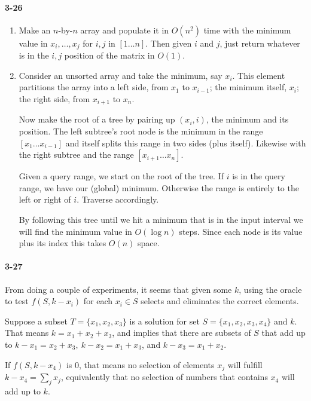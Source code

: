 \documentclass{report}
\begin{document}
\paragraph{3-26}
\begin{enumerate}[label=\alph*)]
	\item Make an $n$-by-$n$ array and populate it in $O(n^2)$ time with the minimum value in $x_i,\ldots,x_j$ for $i,j$ in $[1\ldots n]$. Then given $i$ and $j$, just return whatever is in the $i,j$ position of the matrix in $O(1)$.
	\item Consider an unsorted array and take the minimum, say $x_i$. This element partitions the array into a left side, from $x_1$ to $x_{i-1}$; the minimum itself, $x_i$; the right side, from $x_{i+1}$ to $x_n$.

	Now make the root of a tree by pairing up $(x_i, i)$, the minimum and its position. The left subtree's root node is the minimum in the range $[x_1\ldots x_{i-1}]$ and itself splits this range in two sides (plus itself). Likewise with the right subtree and the range $[x_{i+1}\ldots x_n]$.

	Given a query range, we start on the root of the tree. If $i$ is in the query range, we have our (global) minimum. Otherwise the range is entirely to the left or right of $i$. Traverse accordingly.

	By following this tree until we hit a minimum that is in the input interval we will find the minimum value in $O(\log n)$ steps. Since each node is its value plus its index this takes $O(n)$ space.
\end{enumerate}

\paragraph{3-27} From doing a couple of experiments, it seems that given some $k$, using the oracle to test $f(S, k-x_i)$ for each $x_i\in S$ selects and eliminates the correct elements.

Suppose a subset $T=\{x_1, x_2, x_3\}$ is a solution for set $S=\{x_1, x_2, x_3, x_4\}$ and $k$. That means $k = x_1+x_2+x_3$, and implies that there are subsets of $S$ that add up to $k-x_1=x_2+x_3,\ k-x_2=x_1+x_3$, and $k-x_3=x_1+x_2$.

If $f(S, k-x_4)$ is 0, that means no selection of elements $x_j$ will fulfill $k-x_4=\sum_j x_j$, equivalently that no selection of numbers that contains $x_4$ will add up to $k$.
\end{document}
